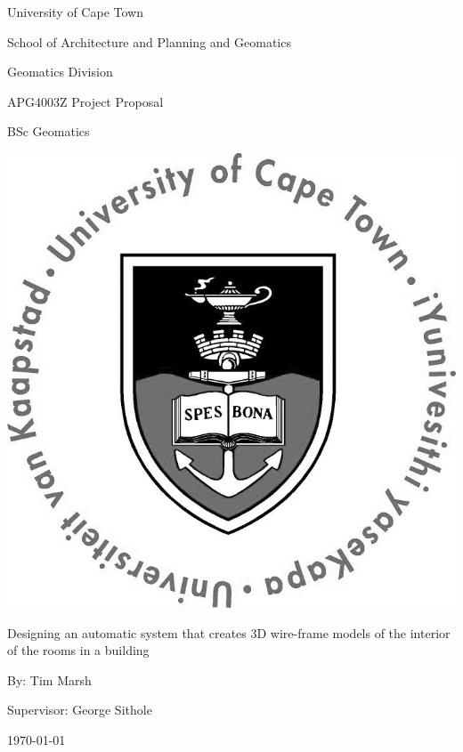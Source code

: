 \begin{center}
{\Huge University of Cape Town}
\linebreak \linebreak

{\LARGE School of Architecture and Planning and Geomatics}
\linebreak \linebreak

{\Large Geomatics Division}
\linebreak \linebreak


{\Large APG4003Z Project Proposal}
\linebreak

{\Large BSc Geomatics}
\linebreak \linebreak

\begin{center}
\includegraphics[width=0.5\linewidth]{./UCTcircular_logo1_CMYK}
\linebreak \linebreak
\end{center}

{\LARGE Designing an automatic system that creates 3D wire-frame models of the interior of the rooms in a building}
\linebreak \linebreak

{\Large By: Tim Marsh}
\linebreak \linebreak

{\Large Supervisor: George Sithole}
\linebreak \linebreak

{\Large \today}

\end{center}
